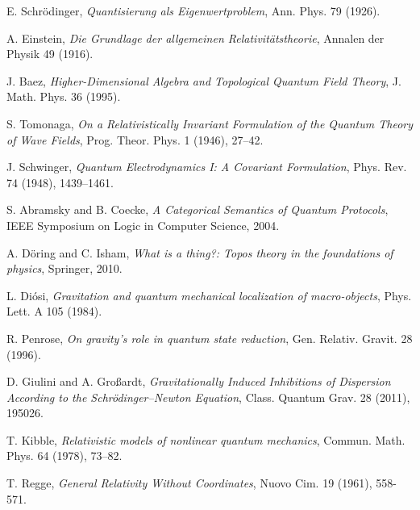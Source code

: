 \documentclass[12pt]{article}
\begin{document}
\begin{thebibliography}{99}
E. Schrödinger, \textit{Quantisierung als Eigenwertproblem}, Ann. Phys. 79 (1926).

A. Einstein, \textit{Die Grundlage der allgemeinen Relativitätstheorie}, Annalen der Physik 49 (1916).

J. Baez, \textit{Higher-Dimensional Algebra and Topological Quantum Field Theory}, J. Math. Phys. 36 (1995).

S. Tomonaga, \textit{On a Relativistically Invariant Formulation of the Quantum Theory of Wave Fields}, Prog. Theor. Phys. 1 (1946), 27–42.

J. Schwinger, \textit{Quantum Electrodynamics I: A Covariant Formulation}, Phys. Rev. 74 (1948), 1439–1461.

S. Abramsky and B. Coecke, \textit{A Categorical Semantics of Quantum Protocols}, IEEE Symposium on Logic in Computer Science, 2004.

A. Döring and C. Isham, \textit{What is a thing?: Topos theory in the foundations of physics}, Springer, 2010.

L. Di\'osi, \textit{Gravitation and quantum mechanical localization of macro-objects}, Phys. Lett. A 105 (1984).

R. Penrose, \textit{On gravity's role in quantum state reduction}, Gen. Relativ. Gravit. 28 (1996).

D. Giulini and A. Gro{\ss}ardt, \textit{Gravitationally Induced Inhibitions of Dispersion According to the Schrödinger–Newton Equation}, Class. Quantum Grav. 28 (2011), 195026.

T. Kibble, \textit{Relativistic models of nonlinear quantum mechanics}, Commun. Math. Phys. 64 (1978), 73–82.

T. Regge, \textit{General Relativity Without Coordinates}, Nuovo Cim. 19 (1961), 558-571.
\end{thebibliography}
\end{document}
